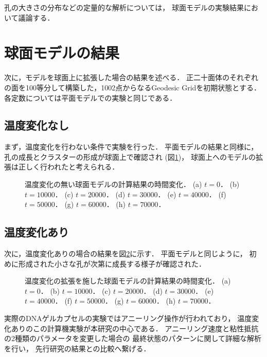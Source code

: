 孔の大きさの分布などの定量的な解析については，
球面モデルの実験結果において議論する．


\section{球面モデルの結果}
次に，モデルを球面上に拡張した場合の結果を述べる．
正二十面体のそれぞれの面を100等分して構築した，1002点からなるGeodesic Gridを初期状態とする．
各定数については平面モデルでの実験と同じである．


\subsection{温度変化なし}
まず，温度変化を行わない条件で実験を行った．
平面モデルの結果と同様に，
孔の成長とクラスターの形成が球面上で確認され
(図\ref{fig:result_sphere_without_anearing})，
球面上へのモデルの拡張は正しく行われたと考えられる．
\begin{figure}
    \centering
    
    \caption{
        温度変化の無い球面モデルの計算結果の時間変化．
        (a) $t=0$．
        (b) $t=10000$．
        (c) $t=20000$．
        (d) $t=30000$．
        (e) $t=40000$．
        (f) $t=50000$．
        (g) $t=60000$．
        (h) $t=70000$．
    }
    \label{fig:result_sphere_without_anearing}
\end{figure}


\subsection{温度変化あり}
次に，温度変化ありの場合の結果を図\ref{fig:result_sphere_with_anearing}に示す．
平面モデルと同じように，
初めに形成された小さな孔が次第に成長する様子が確認された．
\begin{figure}
    \centering
    
    \caption{
        温度変化の拡張を施した球面モデルの計算結果の時間変化．
        (a) $t=0$．
        (b) $t=10000$．
        (c) $t=20000$．
        (d) $t=30000$．
        (e) $t=40000$．
        (f) $t=50000$．
        (g) $t=60000$．
        (h) $t=70000$．
    }
    \label{fig:result_sphere_with_anearing}
\end{figure}

実際のDNAゲルカプセルの実験ではアニーリング操作が行われており，
温度変化ありのこの計算機実験が本研究の中心である．
アニーリング速度と粘性抵抗の2種類のパラメータを変更した場合の
最終状態のパターンに関して詳細な解析を行い，
先行研究の結果との比較へ繋げる．


